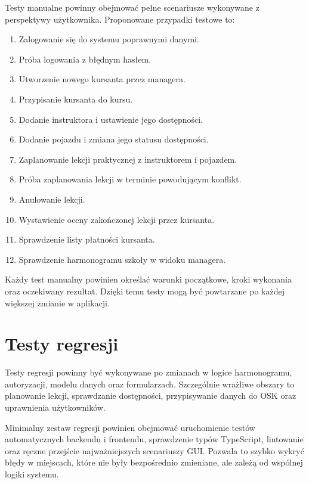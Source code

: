 Testy manualne powinny obejmować pełne scenariusze wykonywane z perspektywy użytkownika. Proponowane przypadki testowe to:
\begin{enumerate}
    \item Zalogowanie się do systemu poprawnymi danymi.
    \item Próba logowania z błędnym hasłem.
    \item Utworzenie nowego kursanta przez managera.
    \item Przypisanie kursanta do kursu.
    \item Dodanie instruktora i ustawienie jego dostępności.
    \item Dodanie pojazdu i zmiana jego statusu dostępności.
    \item Zaplanowanie lekcji praktycznej z instruktorem i pojazdem.
    \item Próba zaplanowania lekcji w terminie powodującym konflikt.
    \item Anulowanie lekcji.
    \item Wystawienie oceny zakończonej lekcji przez kursanta.
    \item Sprawdzenie listy płatności kursanta.
    \item Sprawdzenie harmonogramu szkoły w widoku managera.
\end{enumerate}

Każdy test manualny powinien określać warunki początkowe, kroki wykonania oraz oczekiwany rezultat. Dzięki temu testy mogą być powtarzane po każdej większej zmianie w aplikacji.

\section{Testy regresji}
\label{sec:testy-regresji}

Testy regresji powinny być wykonywane po zmianach w logice harmonogramu, autoryzacji, modelu danych oraz formularzach. Szczególnie wrażliwe obszary to planowanie lekcji, sprawdzanie dostępności, przypisywanie danych do OSK oraz uprawnienia użytkowników.

Minimalny zestaw regresji powinien obejmować uruchomienie testów automatycznych backendu i frontendu, sprawdzenie typów TypeScript, lintowanie oraz ręczne przejście najważniejszych scenariuszy GUI. Pozwala to szybko wykryć błędy w miejscach, które nie były bezpośrednio zmieniane, ale zależą od wspólnej logiki systemu.
